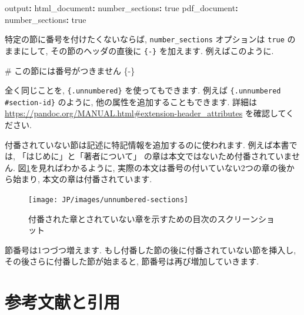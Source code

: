 \documentclass[
  11pt,
  lualatex,ja=standard,jafont=noto]{bxjsreport}
\newenvironment{Shaded}{\begin{snugshade}}{\end{snugshade}}
\newcommand{\AttributeTok}[1]{\textcolor[rgb]{0.77,0.63,0.00}{#1}}
\newcommand{\CharTok}[1]{\textcolor[rgb]{0.31,0.60,0.02}{#1}}
\newcommand{\FunctionTok}[1]{\textcolor[rgb]{0.00,0.00,0.00}{#1}}
\newcommand{\KeywordTok}[1]{\textcolor[rgb]{0.13,0.29,0.53}{\textbf{#1}}}
\begin{document}
\begin{Shaded}
\begin{Highlighting}[]
\FunctionTok{output}\KeywordTok{:}
\AttributeTok{  }\FunctionTok{html\_document}\KeywordTok{:}
\AttributeTok{    }\FunctionTok{number\_sections}\KeywordTok{:}\AttributeTok{ }\CharTok{true}
\AttributeTok{  }\FunctionTok{pdf\_document}\KeywordTok{:}
\AttributeTok{    }\FunctionTok{number\_sections}\KeywordTok{:}\AttributeTok{ }\CharTok{true}
\end{Highlighting}
\end{Shaded}

特定の節に番号を付けたくないならば, \texttt{number\_sections} オプションは \texttt{true} のままにして, その節のヘッダの直後に \texttt{\{-\}} を加えます. 例えばこのように.

\begin{Shaded}
\begin{Highlighting}[]
\FunctionTok{\# この節には番号がつきません \{{-}\}}
\end{Highlighting}
\end{Shaded}

全く同じことを, \texttt{\{.unnumbered\}} を使ってもできます. 例えば \texttt{\{.unnumbered \#section-id\}} のように, 他の属性を追加することもできます. 詳細は \url{https://pandoc.org/MANUAL.html\#extension-header_attributes} を確認してください.

付番されていない節は記述に特記情報を追加するのに使われます. 例えば本書では, 「はじめに」と「著者について」 の章は本文ではないため付番されていません. 図\ref{fig:unnumbered-sections}を見ればわかるように, 実際の本文は番号の付いていない2つの章の後から始まり, 本文の章は付番されています.

\begin{figure}

{\centering \texttt{[image: JP/images/unnumbered-sections]} 

}

\caption{付番された章とされていない章を示すための目次のスクリーンショット}\label{fig:unnumbered-sections}
\end{figure}

節番号は1つづつ増えます. もし付番した節の後に付番されていない節を挿入し, その後さらに付番した節が始まると, 節番号は再び増加していきます.

\hypertarget{bibliography}{%
\section{参考文献と引用}\label{bibliography}}
\end{document}
